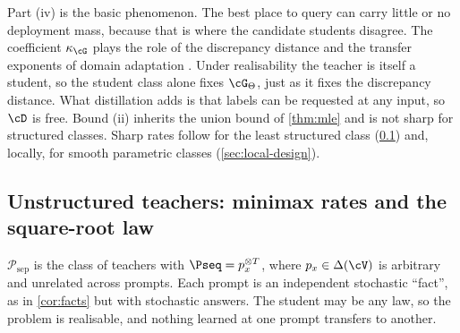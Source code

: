 \noindent
Part (iv) is the basic phenomenon. The best place to query can carry little or no deployment mass,
because that is where the candidate students disagree. The coefficient $\kappa_\cG$ plays the role of
the discrepancy distance and the transfer exponents of domain adaptation
\citep{mansour2009domain,hanneke2019value}. Under realisability the teacher is itself a student, so the
student class alone fixes $\cG_\Theta$, just as it fixes the discrepancy distance. What distillation adds
is that labels can be requested at any input, so $\cD$ is free. Bound (ii) inherits the union bound of \cref{thm:mle} and is not sharp for structured
classes. Sharp rates follow for the least structured class (\cref{sec:separable}) and, locally, for
smooth parametric classes (\cref{sec:local-design}).

\subsection{Unstructured teachers: minimax rates and the square-root law}\label{sec:separable}

\begin{definition}\label{def:separable}
$\mathcal P_{\mathrm{sep}}$ is the class of teachers with $\Pseq=p_x^{\otimes T}$, where $p_x\in\Delta(\cV)$ is
arbitrary and unrelated across prompts. Each prompt is an independent stochastic ``fact'', as in
\cref{cor:facts} but with stochastic answers. The student may be any law, so the problem is
realisable, and nothing learned at one prompt transfers to another.
\end{definition}

